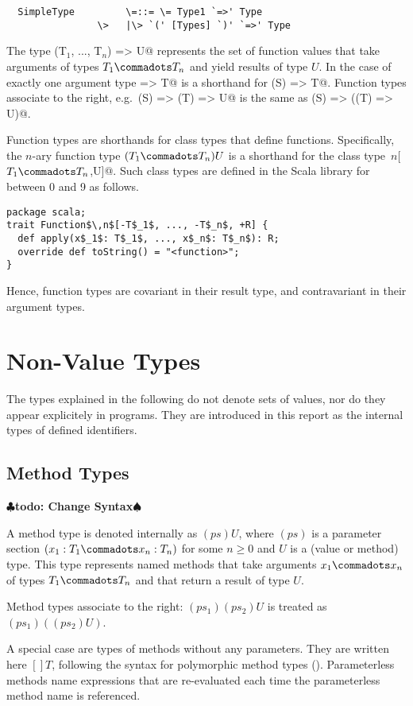 \documentclass[11pt]{report}
\renewcommand{\todo}[1]{{$\clubsuit$\bf todo: #1$\spadesuit$}}
\begin{document}
\syntax\begin{verbatim}
  SimpleType         \=::= \= Type1 `=>' Type
                \>   |\> `(' [Types] `)' `=>' Type
\end{verbatim}
The type \verb@(T$_1$, ..., T$_n$) => U@ represents the set of function
values that take arguments of types $T_1 \commadots T_n$ and yield
results of type $U$.  In the case of exactly one argument type
\verb@S => T@ is a shorthand for \verb@(S) => T@.  Function types
associate to the right, e.g.\ \verb@(S) => (T) => U@ is the same as
\verb@(S) => ((T) => U)@.

Function types are shorthands for class types that define \verb@apply@
functions.  Specifically, the $n$-ary function type $(T_1 \commadots
T_n)U$ is a shorthand for the class type
\verb@Function$\,n$[$T_1 \commadots T_n$,U]@. Such class
types are defined in the Scala library for \verb@n@ between 0 and 9 as follows.
\begin{verbatim}
package scala;
trait Function$\,n$[-T$_1$, ..., -T$_n$, +R] {
  def apply(x$_1$: T$_1$, ..., x$_n$: T$_n$): R;
  override def toString() = "<function>";
}
\end{verbatim}
Hence, function types are covariant in their result type, and
contravariant in their argument types.

\section{Non-Value Types}
\label{sec:synthetic-types}

The types explained in the following do not denote sets of values, nor
do they appear explicitely in programs. They are introduced in this
report as the internal types of defined identifiers.

\subsection{Method Types}
\label{sec:method-types}\todo{Change Syntax}

A method type is denoted internally as $(ps)U$, where $(ps)$ is a
parameter section $(x_1: T_1 \commadots x_n: T_n)$ for some $n \geq 0$
and $U$ is a (value or method) type.  This type represents named
methods that take arguments $x_1 \commadots x_n$ of types $T_1
\commadots T_n$ and that return a result of type $U$.

Method types associate to the right: $(ps_1)(ps_2)U$ is treated as
$(ps_1)((ps_2)U)$.

A special case are types of methods without any parameters. They are
written here $[]T$, following the syntax for polymorphic method types
(). Parameterless methods name expressions that
are re-evaluated each time the parameterless method name is
referenced.
\end{document}
